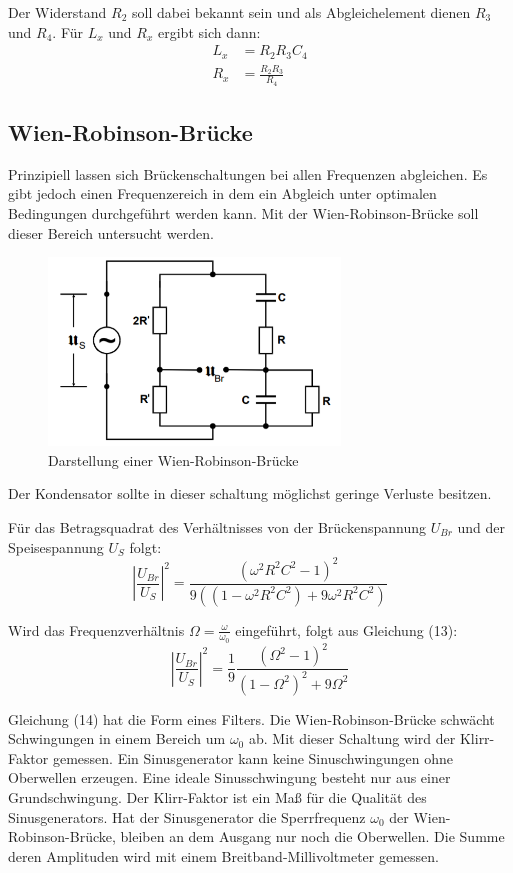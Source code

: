 Der Widerstand $R_2$ soll dabei bekannt sein und als Abgleichelement dienen $R_3$ und $R_4$.
Für $L_x$ und $R_x$ ergibt sich dann:
\begin{align}
  L_x &= R_2 R_3 C_4 \\
  R_x &= \frac{R_2 R_3}{R_4}
\end{align}


\subsection{Wien-Robinson-Brücke}
Prinzipiell lassen sich Brückenschaltungen bei allen Frequenzen abgleichen. Es gibt jedoch einen
Frequenzereich in dem ein Abgleich unter optimalen Bedingungen durchgeführt werden kann. Mit der
Wien-Robinson-Brücke soll dieser Bereich untersucht werden.

\begin{figure}[H]
  \centering
  \includegraphics[height=5cm]{wien.PNG}
  \caption{Darstellung einer Wien-Robinson-Brücke}
  \label{fig:wien}
\end{figure}
Der Kondensator sollte in dieser schaltung möglichst geringe Verluste besitzen.

Für das Betragsquadrat des Verhältnisses von der Brückenspannung $U_{Br}$ und der Speisespannung $U_S$ folgt:
\begin{equation}
  \left|\frac{U_{Br}}{U_S} \right|^2 = \frac{(\omega^2 R^2 C^2 -1)^2}{9((1- \omega^2 R^2 C^2) + 9 \omega^2 R^2 C^2)}
\end{equation}

Wird das Frequenzverhältnis $\Omega = \frac{\omega}{\omega_0}$ eingeführt, folgt aus Gleichung (13):
\begin{equation}
  \left|\frac{U_{Br}}{U_S} \right|^2 = \frac{1}{9} \frac{(\Omega^2 -1)^2}{(1- \Omega^2)^2 + 9 \Omega^2}
\end{equation}

Gleichung (14) hat die Form eines Filters. Die Wien-Robinson-Brücke schwächt Schwingungen in einem
Bereich um $\omega_0$ ab. Mit dieser Schaltung wird der Klirr-Faktor gemessen. Ein Sinusgenerator kann keine
Sinuschwingungen ohne Oberwellen erzeugen. Eine ideale Sinusschwingung besteht nur aus einer Grundschwingung.
Der Klirr-Faktor ist ein Maß für die Qualität des Sinusgenerators. Hat der Sinusgenerator die Sperrfrequenz $\omega_0$
der Wien-Robinson-Brücke, bleiben an dem Ausgang nur noch die Oberwellen. Die Summe deren Amplituden wird mit einem
Breitband-Millivoltmeter gemessen.
